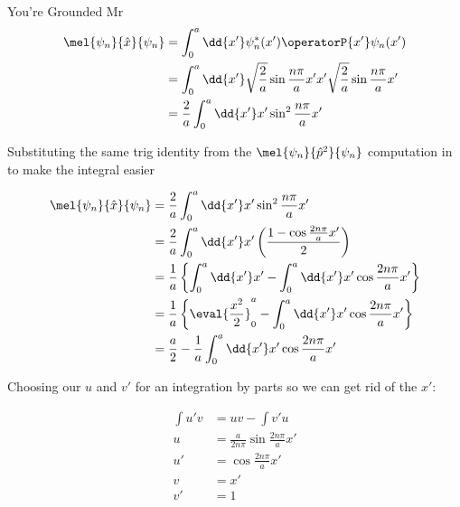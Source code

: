 \begin{answer}
\begin{answerpart}{You're Grounded Mr}
    \begin{equation}
      \begin{split}
        \mel{\psi_n}{\hat{x}}{\psi_n}
        &=
        \int_0^a \dd{x'}
        \psi_{n}^{*}(x')
        \operatorP{x'}
        \psi_{n}(x')\\
        &=
        \int_0^a \dd{x'}
        \sqrt{\frac{2}{a}}\sin{\frac{n\pi}{a}x'}
        x'
        \sqrt{\frac{2}{a}}\sin{\frac{n\pi}{a}x'}
        \\
        &=
        \frac{2}{a}
        \int_0^a \dd{x'}
        x'
        \sin^2{\frac{n\pi}{a}x'}
        \\
      \end{split}
    \end{equation}

    Substituting the same trig identity from the
    $\mel{\psi_n}{\hat{p}^2}{\psi_n}$ computation in to make the
    integral easier

    \begin{equation}
      \begin{split}
        \mel{\psi_n}{\hat{x}}{\psi_n}
        &=
        \frac{2}{a}
        \int_0^a \dd{x'}
        x'
        \sin^2{\frac{n\pi}{a}x'}
        \\
        &=
        \frac{2}{a}
        \int_0^a \dd{x'}
        x'
        \left(\frac{1 - \cos{\frac{2n\pi}{a}x'}}{2}\right)
        \\
        &=
        \frac{1}{a}
        \left\{
        \int_0^a \dd{x'}
        x'
        -
        \int_0^a \dd{x'}
        x'
        \cos{\frac{2n\pi}{a}x'}
        \right\}
        \\
        &=
        \frac{1}{a}
        \left\{
        \eval{\frac{x^2}{2}}_0^a
        -
        \int_0^a \dd{x'}
        x'
        \cos{\frac{2n\pi}{a}x'}
        \right\}
        \\
        &=
        \frac{a}{2}
        -
        \frac{1}{a}
        \int_0^a \dd{x'}
        x'
        \cos{\frac{2n\pi}{a}x'}
        \\
      \end{split}
    \end{equation}

    Choosing our $u$ and $v'$ for an integration by parts so we can
    get rid of the $x'$:

    \begin{equation}
      \begin{split}
        \int u'v &= uv - \int v'u\\
        u &= \frac{a}{2n\pi}\sin{\frac{2n\pi}{a}x'}\\
        u' &= \cos{\frac{2n\pi}{a}x'}\\
        v &= x'\\
        v' &= 1 \\
      \end{split}
    \end{equation}


\end{answerpart}
\end{answer}
